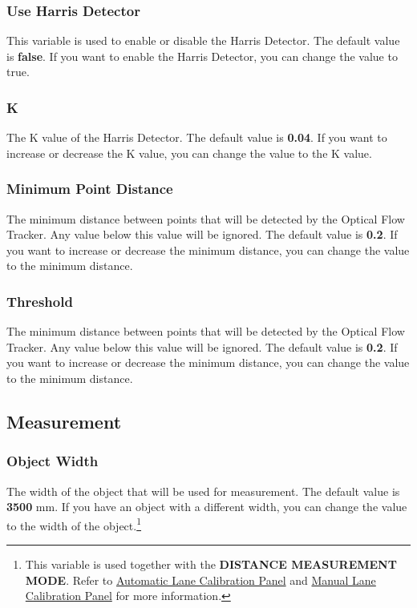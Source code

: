 \subsubsection{Use Harris Detector}
This variable is used to enable or disable the Harris Detector. The default value is \textbf{false}. If you want to enable the Harris Detector, you can change the value to true.

\subsubsection{K}
The K value of the Harris Detector. The default value is \textbf{0.04}. If you want to increase or decrease the K value, you can change the value to the K value.

\subsubsection{Minimum Point Distance}
The minimum distance between points that will be detected by the Optical Flow Tracker. Any value below this value will be ignored. The default value is \textbf{0.2}. If you want to increase or decrease the minimum distance, you can change the value to the minimum distance.

\subsubsection{Threshold}
The minimum distance between points that will be detected by the Optical Flow Tracker. Any value below this value will be ignored. The default value is \textbf{0.2}. If you want to increase or decrease the minimum distance, you can change the value to the minimum distance.

\subsection{Measurement}

\subsubsection{Object Width}
The width of the object that will be used for measurement. The default value is \textbf{3500} mm. If you have an object with a different width, you can change the value to the width of the object.\footnote{This variable is used together with the \textbf{DISTANCE MEASUREMENT MODE}. Refer to \hyperref[sec:auto-lane-calibration-panel]{Automatic Lane Calibration Panel} and \hyperref[sec:manual-lane-calibration-panel]{Manual Lane Calibration Panel} for more information.}

